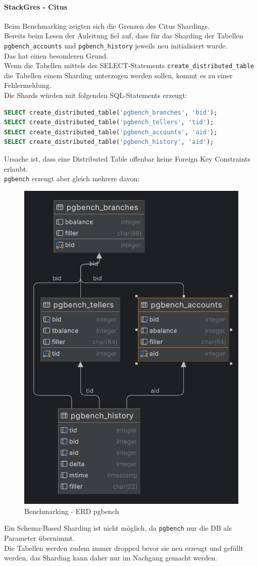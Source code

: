 \begin{flushleft}
    \paragraph{StackGres - Citus}
    Beim Benchmarking zeigten sich die Grenzen des Citus Shardings.\\
    Bereits beim Lesen der Anleitung fiel auf, dass für das Sharding der Tabellen \texttt{pgbench\_accounts} und \texttt{pgbench\_history} jeweils neu initialisiert wurde\cite{6CJFR7RM}.\\
    Das hat einen besonderen Grund.\\
    Wenn die Tabellen mittels des SELECT-Statements \texttt{create\_distributed\_table} die Tabellen einem Sharding unterzogen werden sollen, kommt es zu einer Fehlermeldung.\\
    Die Shards würden mit folgenden SQL-Statements erzeugt:
\lstset{style=gra_codestyle}
\begin{lstlisting}[language=sql, caption=Citus - Benchmarking - Distributed Table Sharding,captionpos=b,label={lst:benchmarking_distributed_table_sharding},breaklines=true]
SELECT create_distributed_table('pgbench_branches', 'bid');
SELECT create_distributed_table('pgbench_tellers', 'tid');
SELECT create_distributed_table('pgbench_accounts', 'aid');
SELECT create_distributed_table('pgbench_history', 'aid');
\end{lstlisting}
    Ursache ist, dass eine Distributed Table offenbar keine Foreign Key Constraints erlaubt.\\
    \texttt{pgbench} erzeugt aber gleich mehrere davon:\\
    \begin{figure}[H]
        \centering
        \includegraphics[width=0.5\linewidth]{source/implementation/evaluation/benchmarking/stackgres_citus/pgbench_accounts}
        \caption{Benchmarking - ERD pgbench}
        \label{fig:pgbench_accounts}
    \end{figure}
    Ein Schema-Based Sharding ist nicht möglich, da \texttt{pgbench} nur die DB als Parameter übernimmt.\\
    Die Tabellen werden zudem immer dropped bevor sie neu erzeugt und gefüllt werden, das Sharding kann daher nur im Nachgang gemacht werden.\\
\end{flushleft}

